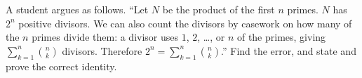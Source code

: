 A student argues as follows. ``Let $N$ be the product of the first $n$ primes. $N$ has $2^n$ positive divisors. We can also count the divisors by casework on how many of the $n$ primes divide them: a divisor uses $1$, $2$, \dots, or $n$ of the primes, giving $\sum_{k=1}^{n}\binom nk$ divisors. Therefore $2^n=\sum_{k=1}^{n}\binom nk$.'' Find the error, and state and prove the correct identity.
